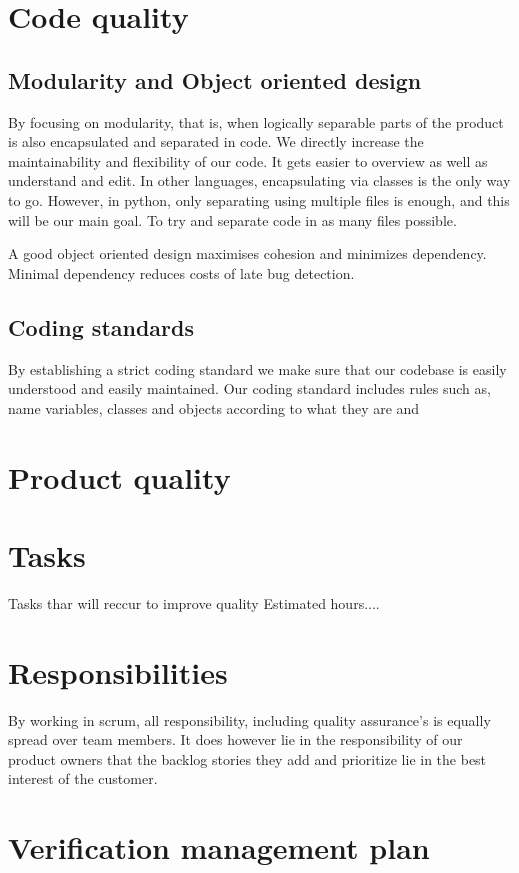 \documentclass{article}
\begin{document}
\section{Code quality}

\subsection{Modularity and Object oriented design}
By focusing on modularity, that is, when logically separable parts of the product is also encapsulated and separated in code. We directly increase the maintainability and flexibility of our code. It gets easier to overview as well as understand and edit. In other languages, encapsulating via classes is the only way to go. However, in python, only separating using multiple files is enough, and this will be our main goal. To try and separate code in as many files possible.

A good object oriented design maximises cohesion and minimizes dependency. Minimal dependency reduces costs of late bug detection.

\subsection{Coding standards}
By establishing a strict coding standard we make sure that our codebase is easily understood and easily maintained. Our coding standard includes rules such as, name variables, classes and objects according to what they are and 


\section{Product quality}

\section{Tasks}
Tasks thar will reccur to improve quality
Estimated hours....
\section{Responsibilities}
By working in scrum, all responsibility, including quality assurance's is equally spread over team members. It does however lie in the responsibility of our product owners that the backlog stories they add and prioritize lie in the best interest of the customer.
\section{Verification management plan}
\end{document}
